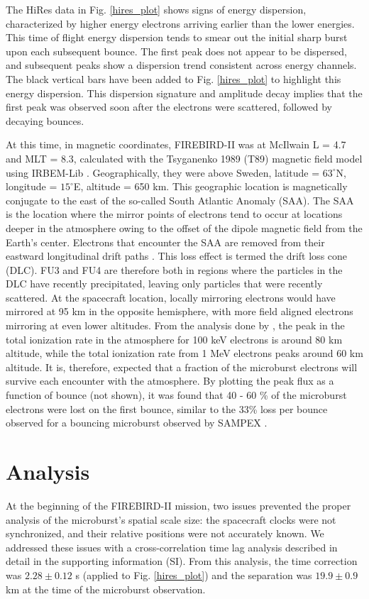\documentclass[draft, linenumbers]{agujournal}
\begin{document}
The HiRes data in Fig. \ref{hires_plot} shows signs of energy dispersion, characterized by higher energy electrons arriving earlier than the lower energies. This time of flight energy dispersion tends to smear out the initial sharp burst upon each subsequent bounce. The first peak does not appear to be dispersed, and subsequent peaks show a dispersion trend consistent across energy channels. The black vertical bars have been added to Fig. \ref{hires_plot} to highlight this energy dispersion. This dispersion signature and amplitude decay implies that the first peak was observed soon after the electrons were scattered, followed by decaying bounces.

At this time, in magnetic coordinates, FIREBIRD-II was at McIlwain L = 4.7 and MLT = 8.3, calculated with the Tsyganenko 1989 (T89) magnetic field model \citep{Tsyganenko1989} using IRBEM-Lib \citep{irbem}. Geographically, they were above Sweden, latitude = $63^{\circ}$N, longitude = $15^{\circ}$E, altitude = 650 km. This geographic location is magnetically conjugate to the east of the so-called South Atlantic Anomaly (SAA). The SAA is the location where the mirror points of electrons tend to occur at locations deeper in the atmosphere owing to the offset of the dipole magnetic field from the Earth's center. Electrons that encounter the SAA are removed from their eastward longitudinal drift paths \citep{Comess2013, Dietrich2010}. This loss effect is termed the drift loss cone (DLC). FU3 and FU4 are therefore both in regions where the particles in the DLC have recently precipitated, leaving only particles that were recently scattered. At the spacecraft location, locally mirroring electrons would have mirrored at 95 km in the opposite hemisphere, with more field aligned electrons mirroring at even lower altitudes. From the analysis done by \citet{Fang2010}, the peak in the total ionization rate in the atmosphere for 100 keV electrons is around 80 km altitude, while the total ionization rate from 1 MeV electrons peaks around 60 km altitude. It is, therefore, expected that a fraction of the microburst electrons will survive each encounter with the atmosphere. By plotting the peak flux as a function of bounce (not shown), it was found that 40 - 60 \% of the microburst electrons were lost on the first bounce, similar to the 33\% loss per bounce observed for a bouncing microburst observed by SAMPEX \citep{Thorne2005}.

\section{Analysis} \label{analysis} %
At the beginning of the FIREBIRD-II mission, two issues prevented the proper analysis of the microburst's spatial scale size: the spacecraft clocks were not synchronized, and their relative positions were not accurately known. We addressed these issues with a cross-correlation time lag analysis described in detail in the supporting information (SI). From this analysis, the time correction was $2.28 \pm 0.12$ s (applied to Fig. \ref{hires_plot}) and the separation was $19.9 \pm 0.9$ km at the time of the microburst observation.
\end{document}
